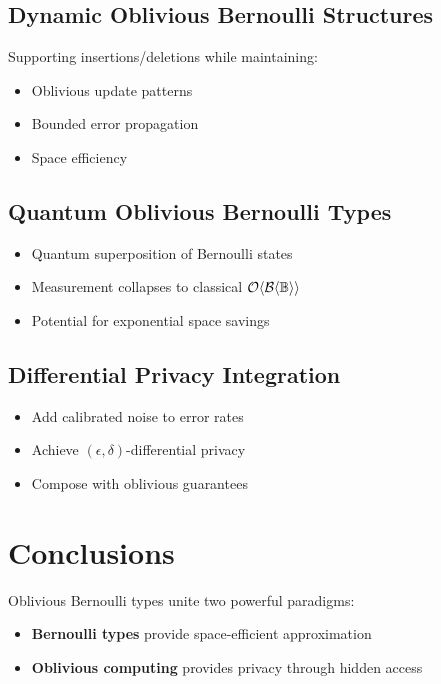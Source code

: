 \documentclass[11pt,final]{article}
\newcommand{\BernBool}{\mathcal{B}\langle \Bool \rangle}
\begin{document}
\subsection{Dynamic Oblivious Bernoulli Structures}

Supporting insertions/deletions while maintaining:
\begin{itemize}
    \item Oblivious update patterns
    \item Bounded error propagation
    \item Space efficiency
\end{itemize}

\subsection{Quantum Oblivious Bernoulli Types}

\begin{itemize}
    \item Quantum superposition of Bernoulli states
    \item Measurement collapses to classical $\Obv{\BernBool}$
    \item Potential for exponential space savings
\end{itemize}

\subsection{Differential Privacy Integration}

\begin{itemize}
    \item Add calibrated noise to error rates
    \item Achieve $(\epsilon, \delta)$-differential privacy
    \item Compose with oblivious guarantees
\end{itemize}

\section{Conclusions}

Oblivious Bernoulli types unite two powerful paradigms:
\begin{itemize}
    \item \textbf{Bernoulli types} provide space-efficient approximation
    \item \textbf{Oblivious computing} provides privacy through hidden access
\end{itemize}
\end{document}
